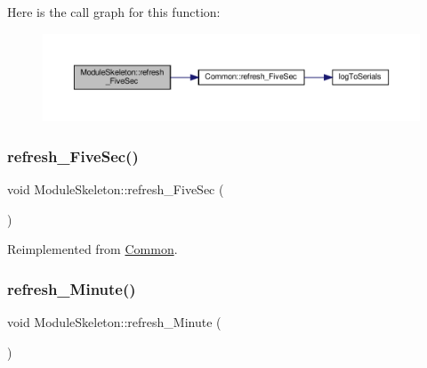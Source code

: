 Here is the call graph for this function\+:
\nopagebreak
\begin{figure}[H]
\begin{center}
\leavevmode
\includegraphics[width=350pt]{class_module_skeleton_a5c9845eec6ca7fbaac1521f4b021712a_cgraph}
\end{center}
\end{figure}
\mbox{\label{class_module_skeleton_a5c9845eec6ca7fbaac1521f4b021712a}} 
\subsubsection{\texorpdfstring{refresh\+\_\+\+Five\+Sec()}{refresh\_FiveSec()}\hspace{0.1cm}{\footnotesize\ttfamily [2/2]}}
{\footnotesize\ttfamily void Module\+Skeleton\+::refresh\+\_\+\+Five\+Sec (\begin{DoxyParamCaption}{ }\end{DoxyParamCaption})\hspace{0.3cm}{\ttfamily [virtual]}}



Reimplemented from \hyperlink{class_common_a604ab36b3a1d9a5bcfcb225149c82f90}{Common}.

\mbox{\label{class_module_skeleton_ada46fe93dc55850a1ccfb80d2a4ee5dd}} 
\subsubsection{\texorpdfstring{refresh\+\_\+\+Minute()}{refresh\_Minute()}\hspace{0.1cm}{\footnotesize\ttfamily [1/2]}}
{\footnotesize\ttfamily void Module\+Skeleton\+::refresh\+\_\+\+Minute (\begin{DoxyParamCaption}{ }\end{DoxyParamCaption})\hspace{0.3cm}{\ttfamily [virtual]}}



